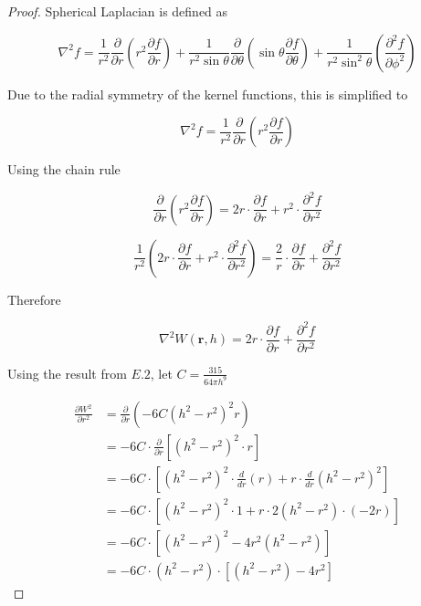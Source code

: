 \documentclass[a4paper, 12pt]{article}
\begin{document}
    \begin{proof}
        Spherical Laplacian is defined as

        $$\nabla^2 f = \frac{1}{r^2}\frac{\partial}{\partial{r}}\left(r^2\frac{\partial{f}}{\partial{r}}\right) + \frac{1}{r^2\sin\theta}\frac{\partial}{\partial{\theta}}\left(\sin\theta\frac{\partial{f}}{\partial{\theta}}\right) + \frac{1}{r^2\sin^2\theta}\left(\frac{\partial^2{f}}{\partial{\phi^2}}\right)$$

        Due to the radial symmetry of the kernel functions, this is simplified to

        $$\nabla^2 f = \frac{1}{r^2}\frac{\partial}{\partial{r}}\left(r^2\frac{\partial{f}}{\partial{r}}\right)$$
        
        Using the chain rule

        $$\frac{\partial}{\partial{r}}\left(r^2\frac{\partial{f}}{\partial{r}}\right) = 2r \cdot \frac{\partial{f}}{\partial{r}} + r^2 \cdot \frac{\partial^2{f}}{\partial{r^2}}$$

        $$\frac{1}{r^2} \left(2r \cdot \frac{\partial{f}}{\partial{r}} + r^2 \cdot \frac{\partial^2{f}}{\partial{r^2}}\right) = \frac{2}{r} \cdot \frac{\partial{f}}{\partial{r}} + \frac{\partial^2{f}}{\partial{r^2}}$$

        Therefore

        $$\nabla^2 W(\textbf{r}, h) = {2}{r} \cdot \frac{\partial{f}}{\partial{r}} + \frac{\partial^2{f}}{\partial{r^2}}$$

        Using the result from $E.2$, let $C = \frac{315}{64\pi{h}^9}$

        \begin{align*}
            \frac{\partial W^2}{\partial r^2} 
            &= \frac{\partial}{\partial r} \left(-6C(h^2 - r^2)^2 r\right) \\
            &= -6C \cdot \frac{\partial}{\partial r} \left[(h^2 - r^2)^2 \cdot r\right] \\
            &= -6C \cdot \left[(h^2 - r^2)^2 \cdot \frac{d}{dr}(r) + r \cdot \frac{d}{dr}(h^2 - r^2)^2\right] \\
            &= -6C \cdot \left[(h^2 - r^2)^2 \cdot 1 + r \cdot 2(h^2 - r^2) \cdot (-2r)\right] \\
            &= -6C \cdot \left[(h^2 - r^2)^2 - 4r^2(h^2 - r^2)\right] \\
            &= -6C \cdot (h^2 - r^2) \cdot \left[(h^2 - r^2) - 4r^2\right]
        \end{align*}


\end{proof}
\end{document}
